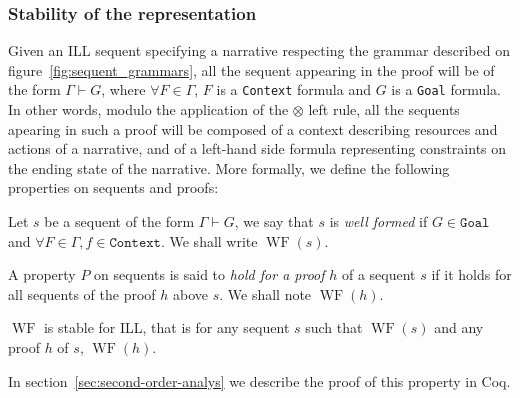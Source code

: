 \documentclass[runningheads,a4paper]{llncs}
\DeclareMathOperator{\wf}{WF}
\begin{document}
\subsubsection{Stability of the representation}
%
Given an ILL sequent specifying a narrative respecting the grammar described on figure~\ref{fig:sequent_grammars}, all the sequent appearing in the proof will be of the form $\Gamma\vdash G $, where $\forall F\in\Gamma$, $F$ is a \texttt{Context} formula and $G$ is a \texttt{Goal} formula. In other words, modulo the application of the $\otimes$ left rule, all the sequents apearing in such a proof will be composed of a context describing resources and actions of a narrative, and of a left-hand side formula representing constraints on the ending state of the narrative.
More formally, we define the following properties on sequents and
proofs:
\begin{definition}
  Let $s$ be a sequent of the form $\Gamma\vdash G$, we say that $s$
  is \emph{well formed} if $G\in\texttt{Goal}$ and $\forall
  F\in\Gamma, f \in \texttt{Context}$. We shall write $\wf(s)$.
\end{definition}
\begin{definition}
  A property $P$ on sequents is said to \emph{hold for a proof} $h$ of
  a sequent $s$ if it holds for all sequents of the proof $h$ above
  $s$. We shall note $\wf(h)$.
\end{definition}
\begin{definition}\label{def:stab}
  $\wf$ is stable for ILL, that is for any sequent $s$ such that
  $\wf(s)$ and any proof $h$ of $s$, $\wf(h)$.
\end{definition}
In section~\ref{sec:second-order-analys} we describe the proof of
this property in Coq.
%
\end{document}
